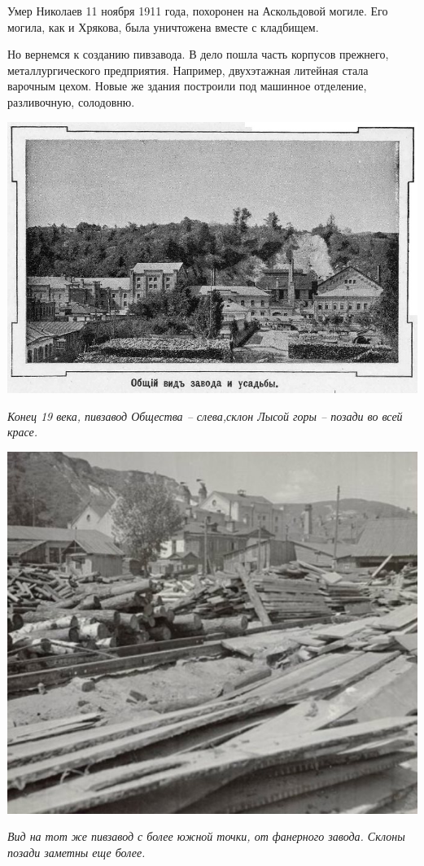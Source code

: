 Умер Николаев 11 ноября 1911 года, похоронен на Аскольдовой могиле. Его могила, как и Хрякова, была уничтожена вместе с кладбищем.

Но вернемся к созданию пивзавода. В дело пошла часть корпусов прежнего, металлургического предприятия. Например, двухэтажная литейная стала варочным цехом. Новые же здания построили под машинное отделение, разливочную, солодовню.

\begin{center}
\includegraphics[width=\linewidth]{chast-kirvys/lys02/pivzavod-tov-02.jpg}

\textit{Конец 19 века, пивзавод Общества – слева,склон Лысой горы – позади во всей красе.}
\end{center}

\begin{center}
\includegraphics[width=0.85\linewidth]{chast-kirvys/lys02/sklony-nad-pivzav.jpg}

\textit{Вид на тот же пивзавод с более южной точки, от фанерного завода. Склоны позади заметны еще более.}
\end{center}



